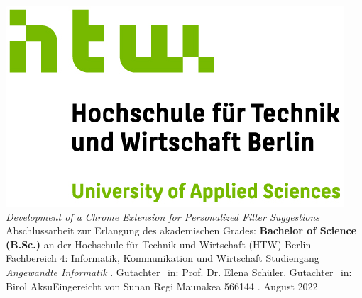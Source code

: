 \documentclass[oneside,bibliography=totocnumbered,BCOR=5mm]{scrbook}%
\theoremstyle{definition}
\theoremstyle{definition}
\theoremstyle{definition}
\theoremstyle{definition}
\theoremstyle{definition}
\theoremstyle{definition}
\begin{document}
\begin{titlepage}
  \begin{center}
    \includegraphics{assets/HTW_Berlin_Logo_farbig.jpg}
    \linebreak[4]
    \linebreak[4]
    \linebreak[4]
    \linebreak[4]
    \textit{\large Development of a Chrome Extension for Personalized Filter Suggestions}
    \linebreak[4]
    \linebreak[4]
    \linebreak[4]
    Abschlussarbeit
    \linebreak[4]
    \linebreak[4]
    zur Erlangung des akademischen Grades:
    \linebreak[4]
    \linebreak[4]
    \textbf{Bachelor of Science (B.Sc.)}
    \linebreak[4]
    \linebreak[4]
    an der
    \linebreak[4]
    \linebreak[4]
    Hochschule f\"ur Technik und Wirtschaft (HTW) Berlin
    \linebreak[4]
    Fachbereich 4: Informatik, Kommunikation und Wirtschaft
    \linebreak[4]
    Studiengang \textit{Angewandte Informatik}
    \linebreak[4]
    \linebreak[4]
    . Gutachter\_in: Prof. Dr. Elena Sch\"uler. Gutachter\_in: Birol Aksu\linebreak[4]
    \linebreak[4]
    \linebreak[4]
    \linebreak[4]
    \linebreak[4]
    Eingereicht von Sunan Regi Maunakea 566144
    \linebreak[4]
    \linebreak[4]
    \linebreak[4]
    . August 2022

  \end{center}
\end{titlepage}
\end{document}

